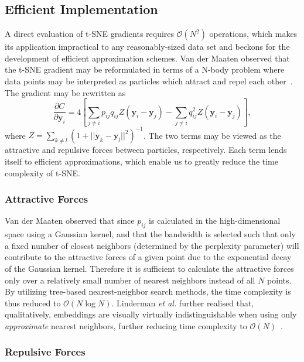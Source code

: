 \documentclass[twocolumn]{bmcart}
\begin{document}
\subsection*{Efficient Implementation}
A direct evaluation of t-SNE gradients requires $\mathcal{O}(N^2)$ operations, which makes its application impractical to any reasonably-sized data set and beckons for the development of efficient approximation schemes. Van der Maaten observed that the t-SNE gradient may be reformulated in terms of a N-body problem where data points may be interpreted as particles which attract and repel each other~\cite{van2014accelerating}. The gradient may be rewritten as
\begin{equation}
\frac{\partial C}{\partial \mathbf{y}_i} = 4 \left [ \sum_{j \neq i} p_{ij} q_{ij} Z \left ( \mathbf{y}_i - \mathbf{y}_j \right ) -\sum_{j \neq i} q_{ij}^2 Z \left ( \mathbf{y}_i - \mathbf{y}_j \right ) \right ], \label{eq:grad_attr_rep}
\end{equation}
where $Z = \sum_{k \neq l}\left ( 1 + || \mathbf{y}_k - \mathbf{y}_l ||^2 \right )^{-1}$. The two terms may be viewed as the attractive and repulsive forces between particles, respectively. Each term lends itself to efficient approximations, which enable us to greatly reduce the time complexity of t-SNE.

\subsubsection*{Attractive Forces}

Van der Maaten observed that since $p_{ij}$ is calculated in the high-dimensional space using a Gaussian kernel, and that the bandwidth is selected such that only a fixed number of closest neighbors (determined by the perplexity parameter) will contribute to the attractive forces of a given point due to the exponential decay of the Gaussian kernel. Therefore it is sufficient to calculate the attractive forces only over a relatively small number of nearest neighbors instead of all $N$ points. By utilizing tree-based nearest-neighbor search methods, the time complexity is thus reduced to $\mathcal{O}(N \log N)$. Linderman \textit{et al.} further realised that, qualitatively, embeddings are visually virtually indistinguishable when using only \textit{approximate} nearest neighbors, further reducing time complexity to $\mathcal{O}(N)$~\cite{linderman2019fast}.

\subsubsection*{Repulsive Forces}
\end{document}
